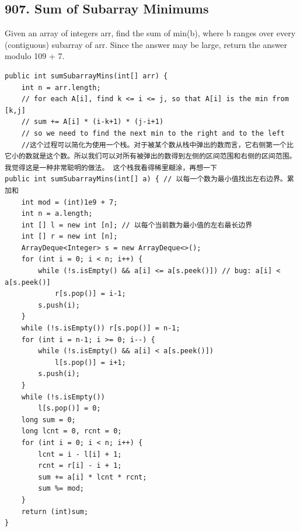 \documentclass[9pt, b5paaper]{book}
\begin{document}
\subsection{907. Sum of Subarray Minimums}
\label{sec-1-4-45}
Given an array of integers arr, find the sum of min(b), where b ranges over every (contiguous) subarray of arr. Since the answer may be large, return the answer modulo 109 + 7.
\begin{verbatim}
public int sumSubarrayMins(int[] arr) {
    int n = arr.length;
    // for each A[i], find k <= i <= j, so that A[i] is the min from [k,j]
    // sum += A[i] * (i-k+1) * (j-i+1)
    // so we need to find the next min to the right and to the left
    //这个过程可以简化为使用一个栈。对于被某个数从栈中弹出的数而言，它右侧第一个比它小的数就是这个数。所以我们可以对所有被弹出的数得到左侧的区间范围和右侧的区间范围。我觉得这是一种非常聪明的做法。 这个栈我看得稀里糊涂，再想一下
public int sumSubarrayMins(int[] a) { // 以每一个数为最小值找出左右边界。累加和
    int mod = (int)1e9 + 7;
    int n = a.length;
    int [] l = new int [n]; // 以每个当前数为最小值的左右最长边界
    int [] r = new int [n];
    ArrayDeque<Integer> s = new ArrayDeque<>();
    for (int i = 0; i < n; i++) {
        while (!s.isEmpty() && a[i] <= a[s.peek()]) // bug: a[i] < a[s.peek()]
            r[s.pop()] = i-1;
        s.push(i);
    }
    while (!s.isEmpty()) r[s.pop()] = n-1;
    for (int i = n-1; i >= 0; i--) {
        while (!s.isEmpty() && a[i] < a[s.peek()])
            l[s.pop()] = i+1;
        s.push(i);
    }
    while (!s.isEmpty()) 
        l[s.pop()] = 0;
    long sum = 0;
    long lcnt = 0, rcnt = 0;
    for (int i = 0; i < n; i++) {
        lcnt = i - l[i] + 1;
        rcnt = r[i] - i + 1;
        sum += a[i] * lcnt * rcnt;
        sum %= mod;
    }
    return (int)sum;
}
\end{verbatim}
\end{document}
